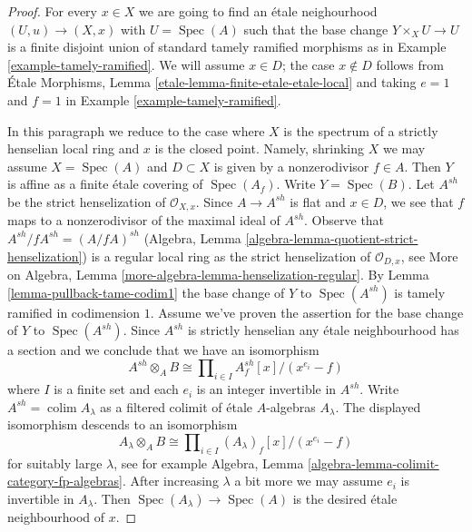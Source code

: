 \documentclass{stacks-project}
\theoremstyle{plain}
\theoremstyle{definition}
\theoremstyle{remark}
\numberwithin{equation}{subsection}
\def\colim{\mathop{\mathrm{colim}}\nolimits}
\def\Spec{\mathop{\mathrm{Spec}}}
\begin{document}
\begin{proof}
For every $x \in X$ we are going to find an \'etale neighourhood
$(U, u) \to (X, x)$ with $U = \Spec(A)$ such that the base change
$Y \times_X U \to U$ is a finite disjoint union of standard tamely ramified
morphisms as in Example \ref{example-tamely-ramified}.
We will assume $x \in D$; the case $x \not \in D$ follows from
\'Etale Morphisms, Lemma \ref{etale-lemma-finite-etale-etale-local}
and taking $e = 1$ and $f = 1$ in Example \ref{example-tamely-ramified}.

\medskip\noindent
In this paragraph we reduce to the case where $X$ is the spectrum of a
strictly henselian local ring and $x$ is the closed point. Namely, shrinking
$X$ we may assume $X = \Spec(A)$ and $D \subset X$ is given by a
nonzerodivisor $f \in A$. Then $Y$ is affine as a finite
\'etale covering of $\Spec(A_f)$. Write $Y = \Spec(B)$.
Let $A^{sh}$ be the strict henselization of $\mathcal{O}_{X, x}$.
Since $A \to A^{sh}$ is flat and $x \in D$, we see that $f$ maps
to a nonzerodivisor of the maximal ideal of $A^{sh}$.
Observe that $A^{sh}/fA^{sh} = (A/fA)^{sh}$
(Algebra, Lemma \ref{algebra-lemma-quotient-strict-henselization})
is a regular local ring as the strict henselization of $\mathcal{O}_{D, x}$,
see More on Algebra, Lemma \ref{more-algebra-lemma-henselization-regular}.
By Lemma \ref{lemma-pullback-tame-codim1}
the base change of $Y$ to $\Spec(A^{sh})$ is tamely ramified in
codimension $1$. Assume we've proven the assertion for the base change
of $Y$ to $\Spec(A^{sh})$. Since $A^{sh}$ is strictly henselian any
\'etale neighbourhood has a section and we conclude that we have an isomorphism
$$
A^{sh} \otimes_A B \cong
\prod\nolimits_{i \in I} A^{sh}_f[x]/(x^{e_i} - f)
$$
where $I$ is a finite set and each $e_i$ is an integer invertible in $A^{sh}$.
Write $A^{sh} = \colim A_\lambda$ as a filtered colimit of \'etale
$A$-algebras $A_\lambda$. The displayed isomorphism
descends to an isomorphism
$$
A_\lambda \otimes_A B \cong \prod\nolimits_{i \in I}
(A_\lambda)_f[x]/(x^{e_i} - f)
$$
for suitably large $\lambda$, see for example
Algebra, Lemma \ref{algebra-lemma-colimit-category-fp-algebras}.
After increasing $\lambda$ a bit
more we may assume $e_i$ is invertible in $A_\lambda$. Then
$\Spec(A_\lambda) \to \Spec(A)$ is the desired \'etale neighbourhood
of $x$.


\end{proof}
\end{document}

